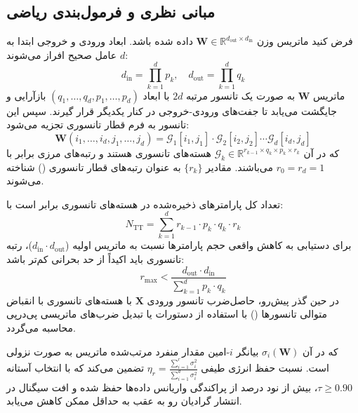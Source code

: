\subsection{مبانی نظری و فرمول‌بندی ریاضی}
فرض کنید ماتریس وزن $\mathbf{W} \in \mathbb{R}^{d_{\text{out}} \times d_{\text{in}}}$ داده شده باشد. ابعاد ورودی و خروجی ابتدا به $d$ عامل صحیح افراز می‌شوند:
\begin{equation}
d_{\text{in}} = \prod_{k=1}^d p_k, \quad d_{\text{out}} = \prod_{k=1}^d q_k
\end{equation}
ماتریس $\mathbf{W}$ به صورت یک تانسور مرتبه $2d$ با ابعاد $(q_1, \dots, q_d, p_1, \dots, p_d)$ بازآرایی و جایگشت می‌یابد تا جفت‌های ورودی-خروجی در کنار یکدیگر قرار گیرند. سپس این تانسور به فرم قطار تانسوری تجزیه می‌شود:
\begin{equation}
\mathbf{W}(i_1, \dots, i_d, j_1, \dots, j_d) = \mathcal{G}_1[i_1, j_1] \cdot \mathcal{G}_2[i_2, j_2] \cdots \mathcal{G}_d[i_d, j_d]
\end{equation}
که در آن $\mathcal{G}_k \in \mathbb{R}^{r_{k-1} \times q_k \times p_k \times r_k}$ هسته‌های تانسوری هستند و رتبه‌های مرزی برابر با $r_0 = r_d = 1$ می‌باشند. مقادیر $\{r_k\}$ به عنوان رتبه‌های قطار تانسوری () شناخته می‌شوند.

تعداد کل پارامترهای ذخیره‌شده در هسته‌های تانسوری برابر است با:
\begin{equation}
N_{\text{TT}} = \sum_{k=1}^d r_{k-1} \cdot p_k \cdot q_k \cdot r_k
\end{equation}
برای دستیابی به کاهش واقعی حجم پارامترها نسبت به ماتریس اولیه ($d_{\text{in}} \cdot d_{\text{out}}$)، رتبه تانسوری باید اکیداً از حد بحرانی کم‌تر باشد:
\begin{equation}
r_{\text{max}} < \frac{d_{\text{out}} \cdot d_{\text{in}}}{\sum_{k=1}^d p_k \cdot q_k}
\end{equation}
در حین گذر پیش‌رو، حاصل‌ضرب تانسور ورودی $\mathbf{X}$ با هسته‌های تانسوری با انقباض متوالی تانسورها () با استفاده از دستورات  یا تبدیل ضرب‌های ماتریسی پی‌درپی محاسبه می‌گردد.

که در آن $\sigma_i(\mathbf{W})$ بیانگر $i$-امین مقدار منفرد مرتب‌شده ماتریس به صورت نزولی است. نسبت حفظ انرژی طیفی $\eta_r = \frac{\sum_{i=1}^r \sigma_i^2}{\sum_{i=1}^{d} \sigma_i^2}$ تضمین می‌کند که با انتخاب آستانه $\tau \ge 0.90$، بیش از نود درصد از پراکندگی واریانس داده‌ها حفظ شده و افت سیگنال در انتشار گرادیان رو به عقب به حداقل ممکن کاهش می‌یابد.

